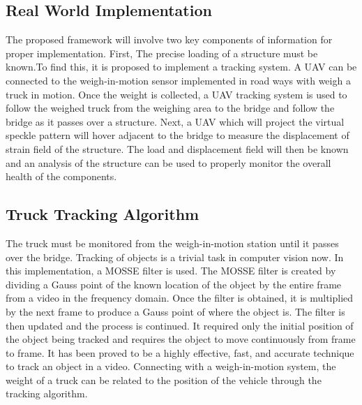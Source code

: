 \documentclass{sigchi}
\begin{document}
\subsection{Real World Implementation}

The proposed framework will involve two key components of information for proper implementation. First, The precise loading of a structure must be known.To find this, it is proposed to implement a tracking system. A UAV can be connected to the weigh-in-motion sensor implemented in road ways with weigh a truck in motion. Once the weight is collected, a UAV tracking system is used to follow the weighed truck from the weighing area to the bridge and follow the bridge as it passes over a structure. Next, a UAV which will project the virtual speckle pattern will hover adjacent to the bridge to measure the displacement of strain field of the structure. The load and displacement field will then be known and an analysis of the structure can be used to properly monitor the overall health of the components. 

\subsection{Truck Tracking Algorithm}

The truck must be monitored from the weigh-in-motion station until it passes over the bridge. Tracking of objects is a trivial task in computer vision now. In this implementation, a MOSSE filter is used. The MOSSE filter is created by dividing a Gauss point of the known location of the object by the entire frame from a video in the frequency domain. Once the filter is obtained, it is multiplied by the next frame to produce a Gauss point of where the object is. The filter is then updated and the process is continued. It required only the initial position of the object being tracked and requires the object to move continuously from frame to frame. It has been proved to be a highly effective, fast, and accurate technique to track an object in a video. Connecting with a weigh-in-motion system, the weight of a truck can be related to the position of the vehicle through the tracking algorithm. 



\end{document}
